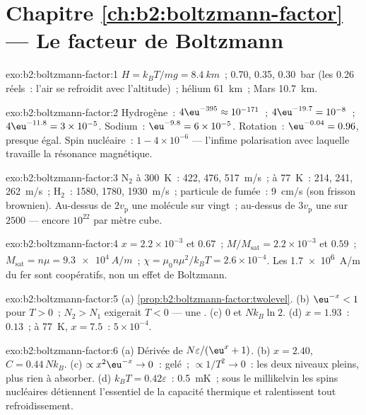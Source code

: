 \section*{Chapitre \ref{ch:b2:boltzmann-factor} --- Le facteur de Boltzmann}

\begin{solution}{exo:b2:boltzmann-factor:1}
$H = k_BT/mg = \qty{8.4}{km}$~; \qty{0.70}{}, \qty{0.35}{}, \qty{0.30}{bar} (les
\qty{0.26}{} réels~: l'air se refroidit avec l'altitude)~; hélium \qty{61}{km}~; Mars
\qty{10.7}{km}.
\end{solution}

\begin{solution}{exo:b2:boltzmann-factor:2}
Hydrogène~: $4\eu^{-395} \approx 10^{-171}$~; $4\eu^{-19.7} = 10^{-8}$~; $4\eu^{-11.8} = 3 \times
10^{-5}$. Sodium~: $\eu^{-9.8} = 6 \times 10^{-5}$. Rotation~: $\eu^{-0.04} = 0.96$, presque
égal. Spin nucléaire~: $1 - 4 \times 10^{-6}$ --- l'infime polarisation avec laquelle
travaille la résonance magnétique.
\end{solution}

\begin{solution}{exo:b2:boltzmann-factor:3}
N$_2$ à \qty{300}{K}~: \qty{422}{}, \qty{476}{}, \qty{517}{m/s}~; à \qty{77}{K}~: \qty{214}{}, \qty{241}{},
\qty{262}{m/s}~; H$_2$~: \qty{1580}{}, \qty{1780}{}, \qty{1930}{m/s}~; particule de fumée~:
\qty{9}{cm/s} (son frisson brownien). Au-dessus de $2v_{\text{p}}$ une molécule sur
vingt~; au-dessus de $3v_{\text{p}}$ une sur $2500$ --- encore $10^{22}$ par mètre cube.
\end{solution}

\begin{solution}{exo:b2:boltzmann-factor:4}
$x = 2.2 \times 10^{-3}$ et $0.67$~; $M/M_{\text{sat}} = 2.2 \times 10^{-3}$ et $0.59$~;
$M_{\text{sat}} = n\mu = \qty{9.3e4}{A/m}$~; $\chi = \mu_0n\mu^2/k_BT = 2.6 \times 10^{-4}$.
Les \qty{1.7e6}{A/m} du fer sont coopératifs, non un effet de Boltzmann.
\end{solution}

\begin{solution}{exo:b2:boltzmann-factor:5}
(a) \cref{prop:b2:boltzmann-factor:twolevel}. (b) $\eu^{-x} < 1$ pour $T > 0$~;
$N_2 > N_1$ exigerait $T < 0$ --- une . (c) $0$ et
$Nk_B\ln 2$. (d) $x = 1.93$~: $0.13$~; à \qty{77}{K}, $x = 7.5$~: $5 \times 10^{-4}$.
\end{solution}

\begin{solution}{exo:b2:boltzmann-factor:6}
(a) Dérivée de $N\varepsilon/(\eu^x + 1)$. (b) $x = 2.40$, $C = 0.44\,Nk_B$.
(c) $\propto x^2\eu^{-x} \to 0$~: gelé~; $\propto 1/T^2 \to 0$~: les deux niveaux pleins,
plus rien à absorber. (d) $k_BT = 0.42\varepsilon$~: \qty{0.5}{mK}~; sous le
millikelvin les spins nucléaires détiennent l'essentiel de la capacité thermique et
ralentissent tout refroidissement.
\end{solution}

